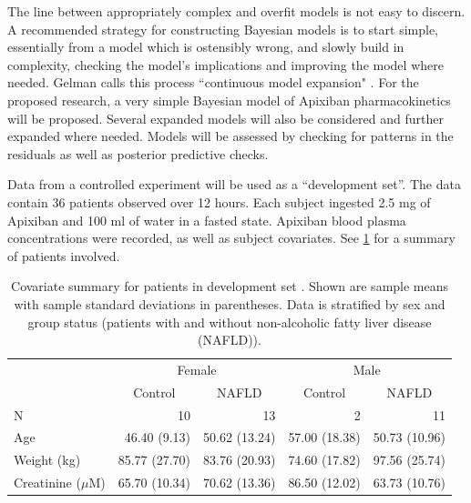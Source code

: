  The line between appropriately complex and overfit models is not easy to discern.  A recommended strategy for constructing Bayesian models is to start simple, essentially from a model which is ostensibly wrong, and slowly build in complexity, checking the model's implications and improving the model where needed.  Gelman calls this process ``continuous model expansion" \cite{gelman2013bayesian, gelman2013philosophy}.  For the proposed research, a very simple Bayesian model of Apixiban pharmacokinetics will be proposed.  Several expanded models will also be considered and further expanded where needed. Models will be assessed by checking for patterns in the residuals as well as posterior predictive checks.

Data from a controlled experiment \cite{tirona2018apixaban} will be used as a ``development set''.  The data contain 36 patients observed over 12 hours. Each subject ingested 2.5 mg of Apixiban and 100 ml of water in a fasted state. Apixiban blood plasma concentrations were recorded, as well as subject covariates.  See \cref{devsettable} for a summary of patients involved.

\begin{table}[b!]
	\centering
\begin{tabular}{lrrrr}
	\toprule
	\multicolumn{1}{c}{ } & \multicolumn{2}{c}{Female} & \multicolumn{2}{c}{Male} \\
	\cmidrule(l{2pt}r{2pt}){2-3} \cmidrule(l{2pt}r{2pt}){4-5}
	& \multicolumn{1}{c}{Control } & \multicolumn{1}{c}{ NAFLD}  & \multicolumn{1}{c}{ Control}  & \multicolumn{1}{c}{NAFLD } \\
	\midrule
	N & 10 & 13 & 2 & 11\\
	Age  & 46.40 (9.13) & 50.62 (13.24) & 57.00 (18.38) & 50.73 (10.96)\\
	Weight (kg)& 85.77 (27.70) & 83.76 (20.93) & 74.60 (17.82) & 97.56 (25.74)\\
	Creatinine ($\mu$M)& 65.70 (10.34) & 70.62 (13.36) & 86.50 (12.02) & 63.73 (10.76)\\
	\bottomrule
\end{tabular}

\caption[Summary of development data set]{Covariate summary for patients in development set \cite{tirona2018apixaban}.  Shown are sample means with sample standard deviations in parentheses.  Data is stratified by sex and group status (patients with and without non-alcoholic fatty liver disease (NAFLD)).}
\label{devsettable}

\end{table}

